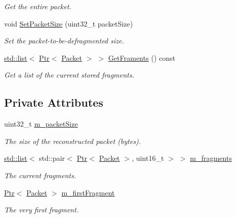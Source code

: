 \begin{DoxyCompactItemize}
\begin{DoxyCompactList}\small\item\em Get the entire packet. \end{DoxyCompactList}\item 
void \hyperlink{classns3_1_1SixLowPanNetDevice_1_1Fragments_a721ee35bf710841ea8ab657c9ed1518e}{Set\+Packet\+Size} (uint32\+\_\+t packet\+Size)
\begin{DoxyCompactList}\small\item\em Set the packet-\/to-\/be-\/defragmented size. \end{DoxyCompactList}\item 
\hyperlink{openflow-interface_8h_afd9bcfa176617760671b67580f536fa7}{std\+::list}$<$ \hyperlink{classns3_1_1Ptr}{Ptr}$<$ \hyperlink{classns3_1_1Packet}{Packet} $>$ $>$ \hyperlink{classns3_1_1SixLowPanNetDevice_1_1Fragments_a08f465c77839a5eda3949e6b73fd8ff4}{Get\+Framents} () const 
\begin{DoxyCompactList}\small\item\em Get a list of the current stored fragments. \end{DoxyCompactList}\end{DoxyCompactItemize}
\subsection*{Private Attributes}
\begin{DoxyCompactItemize}
\item 
uint32\+\_\+t \hyperlink{classns3_1_1SixLowPanNetDevice_1_1Fragments_a8b00ddf1da93a1b9592c0899e31ea666}{m\+\_\+packet\+Size}
\begin{DoxyCompactList}\small\item\em The size of the reconstructed packet (bytes). \end{DoxyCompactList}\item 
\hyperlink{openflow-interface_8h_afd9bcfa176617760671b67580f536fa7}{std\+::list}$<$ std\+::pair$<$ \hyperlink{classns3_1_1Ptr}{Ptr}$<$ \hyperlink{classns3_1_1Packet}{Packet} $>$, uint16\+\_\+t $>$ $>$ \hyperlink{classns3_1_1SixLowPanNetDevice_1_1Fragments_aac778380da2b0a760cdf0c31446bf0f9}{m\+\_\+fragments}
\begin{DoxyCompactList}\small\item\em The current fragments. \end{DoxyCompactList}\item 
\hyperlink{classns3_1_1Ptr}{Ptr}$<$ \hyperlink{classns3_1_1Packet}{Packet} $>$ \hyperlink{classns3_1_1SixLowPanNetDevice_1_1Fragments_ad6212721e0add07220f1b5fbc9994d1c}{m\+\_\+first\+Fragment}
\begin{DoxyCompactList}\small\item\em The very first fragment. \end{DoxyCompactList}\end{DoxyCompactItemize}
